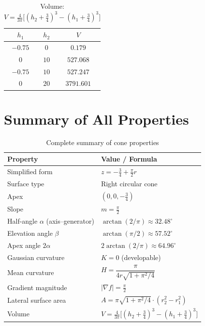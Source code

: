 \documentclass[12pt,a4paper]{article}
\theoremstyle{plain}
\theoremstyle{definition}
\theoremstyle{remark}
\begin{document}
\begin{table}[H]
\centering
\caption{Volume: $V = \tfrac{4}{3\pi}\bigl[(h_2+\tfrac{3}{4})^3-(h_1+\tfrac{3}{4})^3\bigr]$}
\label{tab:volume}
\begin{tabular}{ccc}
\toprule
$h_1$ & $h_2$ & $V$ \\
\midrule
$-0.75$ & $0$  & $0.179$ \\
$0$     & $10$ & $527.068$ \\
$-0.75$ & $10$ & $527.247$ \\
$0$     & $20$ & $3791.601$ \\
\bottomrule
\end{tabular}
\end{table}

\section{Summary of All Properties}

\begin{table}[H]
\centering
\caption{Complete summary of cone properties}\label{tab:summary}
\begin{tabular}{ll}
\toprule
Property & Value / Formula \\
\midrule
Simplified form & $z = -\tfrac{3}{4}+\tfrac{\pi}{2}r$ \\
Surface type & Right circular cone \\
Apex & $(0,0,-\tfrac{3}{4})$ \\
Slope & $m = \tfrac{\pi}{2}$ \\
Half-angle $\alpha$ (axis--generator) & $\arctan(2/\pi)\approx 32.48^\circ$ \\
Elevation angle $\beta$ & $\arctan(\pi/2)\approx 57.52^\circ$ \\
Apex angle $2\alpha$ & $2\arctan(2/\pi)\approx 64.96^\circ$ \\
Gaussian curvature & $K=0$ (developable) \\
Mean curvature & $H = \dfrac{\pi}{4r\sqrt{1+\pi^2/4}}$ \\[4pt]
Gradient magnitude & $|\nabla f| = \tfrac{\pi}{2}$ \\
Lateral surface area & $A = \pi\sqrt{1+\pi^2/4}\cdot(r_2^2-r_1^2)$ \\
Volume & $V = \tfrac{4}{3\pi}\bigl[(h_2+\tfrac{3}{4})^3-(h_1+\tfrac{3}{4})^3\bigr]$ \\
\bottomrule
\end{tabular}
\end{table}
\end{document}
